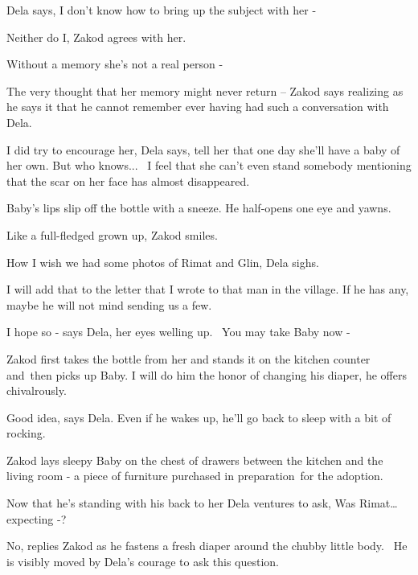 \documentclass[letterpaper]{article}
\begin{document}
Dela says, {\textquotedbl}I don't know how to bring up the subject with her -{\textquotedbl} 

{\textquotedbl}Neither do I,{\textquotedbl} Zakod agrees with her.

{\textquotedbl}Without a memory she's not a real person -{\textquotedbl} 

{\textquotedbl}The very thought that her memory might never return -- {\textquotedbl} Zakod says realizing as he says it
that he cannot remember ever having had such a conversation with Dela. 

{\textquotedbl}I did try to encourage her,{\textquotedbl} Dela says, {\textquotedbl}tell her that one day she'll have a
baby of her own. But who knows...~ I feel that she can't even stand somebody mentioning that the scar on her face has
almost disappeared.{\textquotedbl}

Baby's lips slip off the bottle with a sneeze. He half-opens one eye and yawns. 

{\textquotedbl}Like a full-fledged grown up,{\textquotedbl} Zakod smiles. 

{\textquotedbl}How I wish we had some photos of Rimat and Glin,{\textquotedbl} Dela sighs.

{\textquotedbl}I will add that to the letter that I wrote to that man in the village. If he has any, maybe he will not
mind sending us a few.{\textquotedbl} 

{\textquotedbl}I hope so -{\textquotedbl} says Dela, her eyes welling up. ~{\textquotedbl}You may take Baby now
-{\textquotedbl} 

Zakod first takes the bottle from her and stands it on the kitchen counter and\ then picks up Baby. {\textquotedbl}I
will do him the honor of changing his diaper,{\textquotedbl} he offers chivalrously.~

{\textquotedbl}Good idea,{\textquotedbl} says Dela. {\textquotedbl}Even if he wakes up, he'll go back to sleep with a
bit of rocking.{\textquotedbl} 

Zakod lays sleepy Baby on the chest of drawers between the kitchen and the living room - a piece of furniture purchased
in preparation~for the adoption.

Now that he's standing with his back to her Dela ventures to ask, {\textquotedbl}Was Rimat{\dots} expecting
-?{\textquotedbl}\ 

{\textquotedbl}No,{\textquotedbl} replies Zakod as he fastens a fresh diaper around the chubby little body.~ He is
visibly moved by Dela's courage to ask this question.
\end{document}
